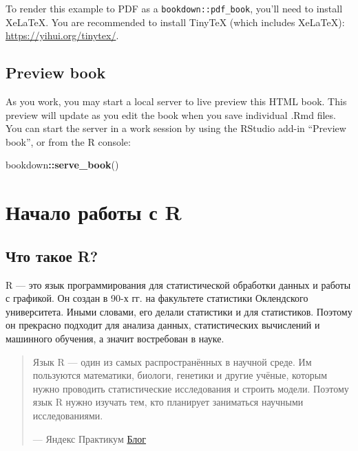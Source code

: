 \documentclass[
]{book}
\newenvironment{Shaded}{\begin{snugshade}}{\end{snugshade}}
\newcommand{\FunctionTok}[1]{\textcolor[rgb]{0.13,0.29,0.53}{\textbf{#1}}}
\newcommand{\NormalTok}[1]{#1}
\newcommand{\SpecialCharTok}[1]{\textcolor[rgb]{0.81,0.36,0.00}{\textbf{#1}}}
\theoremstyle{definition}
\theoremstyle{definition}
\theoremstyle{definition}
\theoremstyle{definition}
\theoremstyle{remark}
\begin{document}
To render this example to PDF as a \texttt{bookdown::pdf\_book}, you'll need to install XeLaTeX. You are recommended to install TinyTeX (which includes XeLaTeX): \url{https://yihui.org/tinytex/}.

\hypertarget{preview-book}{%
\section{Preview book}\label{preview-book}}

As you work, you may start a local server to live preview this HTML book. This preview will update as you edit the book when you save individual .Rmd files. You can start the server in a work session by using the RStudio add-in ``Preview book'', or from the R console:

\begin{Shaded}
\begin{Highlighting}[]
\NormalTok{bookdown}\SpecialCharTok{::}\FunctionTok{serve\_book}\NormalTok{()}
\end{Highlighting}
\end{Shaded}

\hypertarget{ux43dux430ux447ux430ux43bux43e-ux440ux430ux431ux43eux442ux44b-ux441-r}{%
\chapter{Начало работы с R}\label{ux43dux430ux447ux430ux43bux43e-ux440ux430ux431ux43eux442ux44b-ux441-r}}

\hypertarget{ux447ux442ux43e-ux442ux430ux43aux43eux435-r}{%
\section{Что такое R?}\label{ux447ux442ux43e-ux442ux430ux43aux43eux435-r}}

R --- это язык программирования для статистической обработки данных и работы с графикой. Он создан в 90-х гг. на факультете статистики Оклендского университета. Иными словами, его делали статистики и для статистиков. Поэтому он прекрасно подходит для анализа данных, статистических вычислений и машинного обучения, а значит востребован в науке.

\begin{quote}
Язык R --- один из самых распространённых в научной среде. Им пользуются математики, биологи, генетики и другие учёные, которым нужно проводить статистические исследования и строить модели. Поэтому язык R нужно изучать тем, кто планирует заниматься научными исследованиями.

--- Яндекс Практикум \href{https://practicum.yandex.ru/blog/chto-takoe-yazyk-r/\#chto-takoe}{Блог}
\end{quote}
\end{document}

